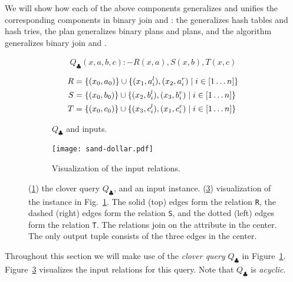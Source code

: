We will show how each of the above components generalizes 
  and unifies the corresponding components in binary join 
  and \GJ: 
  the \GHT generalizes hash tables and hash tries,
  the \FJ plan generalizes binary plans and \GJ plans, and
  the \FJ algorithm generalizes binary join and \GJ.

\begin{figure}
\begin{subfigure}[b]{0.4\linewidth}
\begin{align*}
  Q_{\clubsuit}(x,a,b,c) :- R(x,a),S(x,b),T(x,c)
\end{align*}
\begin{align*}
  R & = \{(x_0, a_0)\} \cup \{{(x_1, a_i^l), (x_2, a_i^r)}\mid{i \in [1 \ldots n]}\} \\
  S & = \{(x_0, b_0)\} \cup \{{(x_2, b_i^l), (x_3, b_i^r)}\mid{i \in [1 \ldots n]}\} \\
  T & = \{(x_0, c_0)\} \cup \{{(x_3, c_i^l), (x_1, c_i^r)}\mid{i \in [1 \ldots n]}\} 
\end{align*}
\caption{$Q_\clubsuit$ and inputs.}
\label{fig:clover-query}
\end{subfigure}
\begin{subfigure}[b]{0.5\linewidth}
  \centering
  \texttt{[image: sand-dollar.pdf]}
  \caption{Visualization of the input relations.}
  \label{fig:clover-vis}
\end{subfigure}
\caption{(\ref{fig:clover-query}) the clover query $Q_\clubsuit$, and an input instance.
(\ref{fig:clover-vis}) visualization of the instance in
    Fig.~\ref{fig:clover-query}. The solid (top) edges form the relation
    \texttt{R}, the dashed (right) edges form the relation \texttt{S},
    and the dotted (left) edges form the relation \texttt{T}.  The
    relations join on the attribute in the center.  The only output
    tuple consists of the three edges in the center. }
\end{figure}

Throughout this section we will make use of the {\em clover query}
$Q_\clubsuit$ in Figure~\ref{fig:clover-query}.
Figure~\ref{fig:clover-vis} visualizes the input relations for this query.
Note that $Q_\clubsuit$ is
\emph{acyclic}.

